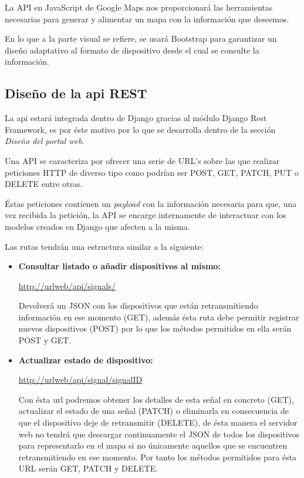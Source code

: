 La API en JavaScript de Google Maps nos proporcionará las herramientas necesarias para generar y alimentar un mapa con la información que deseemos.

\bigskip

En lo que a la parte visual se refiere, se usará Bootstrap para garantizar un diseño adaptativo al formato de dispositivo desde el cual se consulte la información.

\subsection{Diseño de la api REST}

La api estará integrada dentro de Django gracias al módulo Django Rest Framework, es por éste motivo por lo que se desarrolla dentro de la sección \textit{Diseño del portal web}.

\bigskip

Una API se caracteriza por ofrecer una serie de URL's sobre las que realizar peticiones HTTP de diverso tipo como podrían ser POST, GET, PATCH, PUT o DELETE entre otras.

Éstas peticiones contienen un \textit{payload} con la información necesaria para que, una vez recibida la petición, la API se encarge internamente de interactuar con los modelos creados en Django que afecten a la misma.

\bigskip

Las rutas tendrán una estructura similar a la siguiente:

\begin{itemize}
  \item \textbf{Consultar listado o añadir dispositivos al mismo:}

  \url{http://urlweb/api/signals/}

  Devolverá un JSON con los dispositivos que están retransmitiendo información en ese momento (GET), además ésta ruta debe permitir registrar nuevos dispositivos (POST) por lo que los métodos permitidos en ella serán POST y GET.

  \item \textbf{Actualizar estado de dispositivo:}

  \url{http://urlweb/api/signal/signalID}

  Con ésta url podremos obtener los detalles de esta señal en concreto (GET), actualizar el estado de una señal (PATCH) o eliminarla en consecuencia de que el dispositivo deje de retransmitir (DELETE), de ésta manera el servidor web no tendrá que descargar continuamente el JSON de todos los dispositivos para representarlo en el mapa si no únicamente aquellos que se encuentren retransmitiendo en ese momento. Por tanto los métodos permitidos para ésta URL serán GET, PATCH y DELETE.
\end{itemize}
